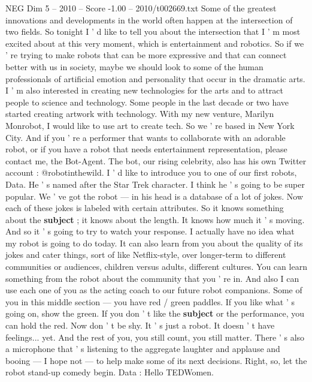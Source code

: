 \begin{textsample}{NEG Dim 5 – 2010 – Score -1.00 – 2010/t002669.txt}  \label{ex:f5_neg_054}
Some of the greatest innovations and developments in the world often happen at the intersection of two fields.
So tonight I ' d like to tell you about the intersection that I ' m most excited about at this very moment, which is entertainment and robotics.
So if we ' re trying to make robots that can be more expressive and that can connect better with us in society, maybe we should look to some of the human professionals of artificial emotion and personality that occur in the dramatic arts.
I ' m also interested in creating new technologies for the arts and to attract people to science and technology.
Some people in the last decade or two have started creating artwork with technology.
With my new venture, Marilyn Monrobot, I would like to use art to create tech.
So we ' re based in New York City.
And if you ' re a performer that wants to collaborate with an adorable robot, or if you have a robot that needs entertainment representation, please contact me, the Bot-Agent.
The bot, our rising celebrity, also has his own Twitter account : @robotinthewild.
I ' d like to introduce you to one of our first robots, Data.
He ' s named after the Star Trek character.
I think he ' s going to be super popular.
We ' ve got the robot — in his head is a database of a lot of jokes.
Now each of these jokes is labeled with certain attributes.
So it knows something about the \textbf{subject} ; it knows about the length.
It knows how much it ' s moving.
And so it ' s going to try to watch your response.
I actually have no idea what my robot is going to do today.
It can also learn from you about the quality of its jokes and cater things, sort of like Netflix-style, over longer-term to different communities or audiences, children versus adults, different cultures.
You can learn something from the robot about the community that you ' re in.
And also I can use each one of you as the acting coach to our future robot companions.
Some of you in this middle section — you have red / green paddles.
If you like what ' s going on, show the green.
If you don ' t like the \textbf{subject} or the performance, you can hold the red.
Now don ' t be shy.
It ' s just a robot.
It doesn ' t have feelings... yet.
And the rest of you, you still count, you still matter.
There ' s also a microphone that ' s listening to the aggregate laughter and applause and booing — I hope not — to help make some of its next decisions.
Right, so, let the robot stand-up comedy begin.
Data : Hello TEDWomen.

\end{textsample}
